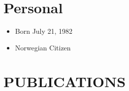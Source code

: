 \documentclass[margin]{res}
\begin{document}

\address{mob:  +47 90 56 64 62 \\ email: johannes.mauritzen@bi.no \\
website:  \url{jmaurit.github.io}}

\section{Personal}
\begin{itemize}
\item[] Born July 21, 1982
\item[] Norwegian Citizen
\end{itemize}

\section{PUBLICATIONS}
\end{document}
